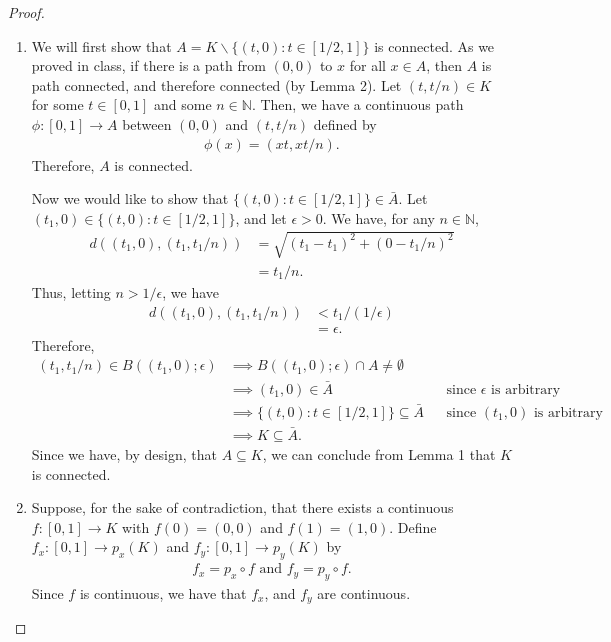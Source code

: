 \documentclass[10pt,a4paper]{article}
\theoremstyle{theorem}
\theoremstyle{definition}
\begin{document}
\begin{proof}
\begin{enumerate}
\item We will first show that $A = K \backslash  \{(t, 0): t \in [1/2, 1]\}$ is connected. As we proved in class,  if there is a path from $(0, 0)$ to $ x$ for all $x \in A$,  then $A$ is path connected, and therefore connected (by Lemma 2).  Let $(t, t/n) \in K$ for some $t \in [0, 1]$ and some $n \in \mathbb{N}$. Then, we have a continuous path $\phi: [0, 1] \to A$ between $(0, 0)$ and $(t, t/n)$ defined by 
\begin{align*}
\phi(x) = (xt, xt/n).
\end{align*}
Therefore, $A$ is connected.

Now we would like to show that $\{(t, 0): t \in [1/2, 1]\} \in \bar{A}$. Let $(t_1, 0) \in \{(t, 0): t \in [1/2, 1]\}$, and let $\epsilon > 0$. We have, for any $n \in \mathbb{N}$,
\begin{align*}
d((t_1, 0), (t_1, t_1/n)) &= \sqrt{(t_1 - t_1)^2 + (0 - t_1/n)^2}\\
&= t_1/n.
\end{align*}
Thus, letting $n > 1/\epsilon$, we have
\begin{align*}
d((t_1, 0), (t_1, t_1/n)) &<  t_1/(1/\epsilon)\\
&= \epsilon.
\end{align*}
Therefore, 
\begin{align*}
(t_1, t_1/n) \in B((t_1, 0); \epsilon) &\implies B((t_1, 0); \epsilon) \cap A \not = \emptyset\\
&\implies (t_1, 0) \in \bar{A} && \text{since } \epsilon \text{ is arbitrary}\\
&\implies \{(t, 0): t \in [1/2, 1]\} \subseteq{\bar{A}} && \text{since } (t_1, 0) \text{ is arbitrary}\\
&\implies K \subseteq \bar{A}.
\end{align*}
Since we have, by design, that $A \subseteq K$, we can conclude from Lemma 1 that $K$ is connected.

\item Suppose, for the sake of contradiction, that there exists a continuous $f:[0, 1] \to K$ with $f(0) = (0, 0)$ and $f(1) = (1, 0)$. Define $f_x:[0, 1] \to p_x(K)$ and $f_y:[0, 1] \to p_y(K)$ by
\begin{align*}
f_x = p_x \circ f \text{ and } f_y = p_y \circ f. 
\end{align*}
Since $f$ is continuous,  we have that $f_x$, and $f_y$ are continuous.  



\end{enumerate}
\end{proof}
\end{document}
